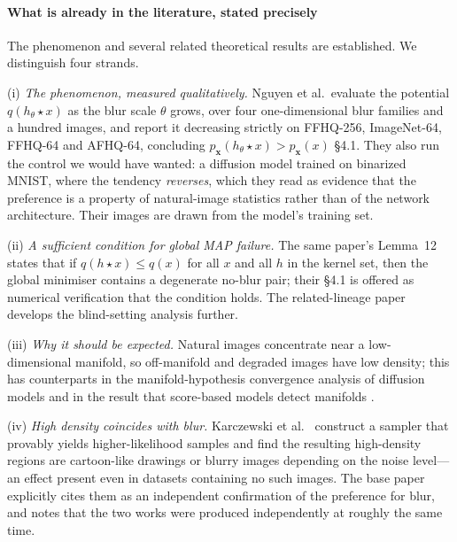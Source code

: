 \documentclass[10pt,journal]{IEEEtran}
\newcommand{\blur}{\star}
\begin{document}
\paragraph*{What is already in the literature, stated precisely}
The phenomenon and several related theoretical results are established. We distinguish four
strands.

(i) \emph{The phenomenon, measured qualitatively.} Nguyen et al.\ evaluate the potential
$q(h_\theta\blur x)$ as the blur scale $\theta$ grows, over four one-dimensional blur families
and a hundred images, and report it decreasing strictly on FFHQ-256, ImageNet-64, FFHQ-64 and
AFHQ-64, concluding $p_{\boldsymbol{x}}(h_\theta\blur x)>p_{\boldsymbol{x}}(x)$
\cite{nguyen2025morsebott}\S4.1. They also run the control we would have wanted: a diffusion
model trained on binarized MNIST, where the tendency \emph{reverses}, which they read as
evidence that the preference is a property of natural-image statistics rather than of the network
architecture. Their images are drawn from the model's training set.

(ii) \emph{A sufficient condition for global MAP failure.} The same paper's Lemma~12 states that
if $q(h\blur x)\le q(x)$ for all $x$ and all $h$ in the kernel set, then the global minimiser
contains a degenerate no-blur pair; their \S4.1 is offered as numerical verification that the
condition holds. The related-lineage paper \cite{debarnot2023blind} develops the blind-setting
analysis further.

(iii) \emph{Why it should be expected.} Natural images concentrate near a low-dimensional
manifold, so off-manifold and degraded images have low density; this has counterparts in the
manifold-hypothesis convergence analysis of diffusion models \cite{debortoli2022manifold} and in
the result that score-based models detect manifolds \cite{pidstrigach2022manifolds}.

(iv) \emph{High density coincides with blur.} Karczewski et al.\
\cite{karczewski2025cartoonists} construct a sampler that provably yields higher-likelihood
samples and find the resulting high-density regions are cartoon-like drawings or blurry images
depending on the noise level---an effect present even in datasets containing no such images. The
base paper explicitly cites them as an independent confirmation of the preference for blur, and
notes that the two works were produced independently at roughly the same time.
\end{document}
